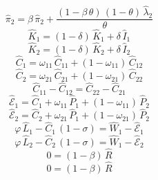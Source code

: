 \begin{dmath}
{{\hat{\pi}_{2}}}={{\beta}}\, {{\hat{\pi}_{2}}}+\frac{\left(1-{{\beta}}\, {{\theta}}\right)\, \left(1-{{\theta}}\right)\, {{\hat{\lambda}_{2}}}}{{{\theta}}}
\end{dmath}
\begin{dmath}
{{\hat{K}_{1}}}=\left(1-{{\delta}}\right)\, {{\hat{K}_{1}}}+{{\delta}}\, {{\hat{I}_{1}}}
\end{dmath}
\begin{dmath}
{{\hat{K}_{2}}}=\left(1-{{\delta}}\right)\, {{\hat{K}_{2}}}+{{\delta}}\, {{\hat{I}_{2}}}
\end{dmath}
\begin{dmath}
{{\hat{C}_{1}}}={{\omega_{11}}}\, {{\hat{C}_{1 1}}}+\left(1-{{\omega_{11}}}\right)\, {{\hat{C}_{1 2}}}
\end{dmath}
\begin{dmath}
{{\hat{C}_{2}}}={{\omega_{21}}}\, {{\hat{C}_{2 1}}}+\left(1-{{\omega_{21}}}\right)\, {{\hat{C}_{2 2}}}
\end{dmath}
\begin{dmath}
{{\hat{C}_{1 1}}}-{{\hat{C}_{1 2}}}={{\hat{C}_{2 2}}}-{{\hat{C}_{2 1}}}
\end{dmath}
\begin{dmath}
{{\hat{\mathscr{E}}_{1}}}={{\hat{C}_{1}}}+{{\omega_{11}}}\, {{\hat{P}_{1}}}+\left(1-{{\omega_{11}}}\right)\, {{\hat{P}_{2}}}
\end{dmath}
\begin{dmath}
{{\hat{\mathscr{E}}_{2}}}={{\hat{C}_{2}}}+{{\omega_{21}}}\, {{\hat{P}_{1}}}+\left(1-{{\omega_{21}}}\right)\, {{\hat{P}_{2}}}
\end{dmath}
\begin{dmath}
{{\varphi}}\, {{\hat{L}_{1}}}-{{\hat{C}_{1}}}\, \left(1-{{\sigma}}\right)={{\hat{W}_{1}}}-{{\hat{\mathscr{E}}_{1}}}
\end{dmath}
\begin{dmath}
{{\varphi}}\, {{\hat{L}_{2}}}-{{\hat{C}_{2}}}\, \left(1-{{\sigma}}\right)={{\hat{W}_{1}}}-{{\hat{\mathscr{E}}_{2}}}
\end{dmath}
\begin{dmath}
0=\left(1-{{\beta}}\right)\, {{\hat{R}}}
\end{dmath}
\begin{dmath}
0=\left(1-{{\beta}}\right)\, {{\hat{R}}}
\end{dmath}
